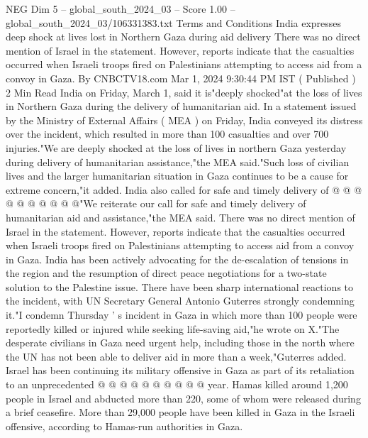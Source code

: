 \begin{textsample}{NEG Dim 5 – global\_south\_2024\_03 – Score 1.00 – global\_south\_2024\_03/106331383.txt}  \label{ex:f5_neg_314}
Terms and Conditions India expresses deep shock at lives lost in Northern Gaza during aid delivery There was no direct mention of Israel in the statement.
However, reports indicate that the casualties occurred when Israeli troops fired on Palestinians attempting to access aid from a convoy in Gaza.
By CNBCTV18.com Mar 1, 2024 9:30:44 PM IST ( Published ) 2 Min Read India on Friday, March 1, said it is"deeply shocked"at the loss of lives in Northern Gaza during the delivery of humanitarian aid.
In a statement issued by the Ministry of External Affairs ( MEA ) on Friday, India conveyed its distress over the incident, which resulted in more than 100 casualties and over 700 injuries."We are deeply shocked at the loss of lives in northern Gaza yesterday during delivery of humanitarian assistance,"the MEA said."Such loss of civilian lives and the larger humanitarian situation in Gaza continues to be a cause for extreme concern,"it added.
India also called for safe and timely delivery of @ @ @ @ @ @ @ @ @ @"We reiterate our call for safe and timely delivery of humanitarian aid and assistance,"the MEA said.
There was no direct mention of Israel in the statement.
However, reports indicate that the casualties occurred when Israeli troops fired on Palestinians attempting to access aid from a convoy in Gaza.
India has been actively advocating for the de-escalation of tensions in the region and the resumption of direct peace negotiations for a two-state solution to the Palestine issue.
There have been sharp international reactions to the incident, with UN Secretary General Antonio Guterres strongly condemning it."I condemn Thursday ' s incident in Gaza in which more than 100 people were reportedly killed or injured while seeking life-saving aid,"he wrote on X."The desperate civilians in Gaza need urgent help, including those in the north where the UN has not been able to deliver aid in more than a week,"Guterres added.
Israel has been continuing its military offensive in Gaza as part of its retaliation to an unprecedented @ @ @ @ @ @ @ @ @ @ year.
Hamas killed around 1,200 people in Israel and abducted more than 220, some of whom were released during a brief ceasefire.
More than 29,000 people have been killed in Gaza in the Israeli offensive, according to Hamas-run authorities in Gaza.

\end{textsample}
